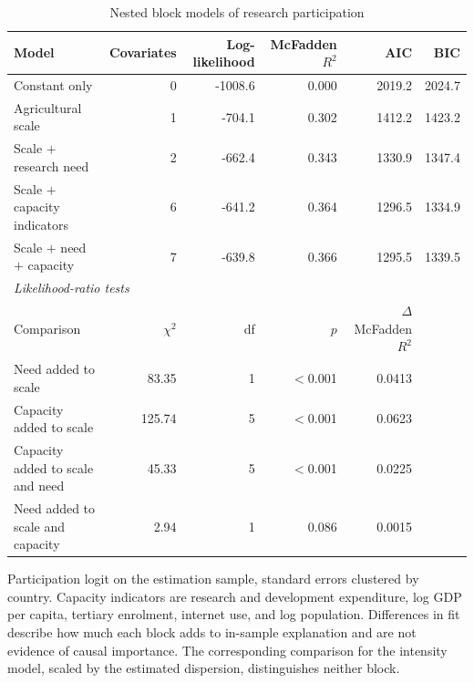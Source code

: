 \documentclass[ASNA,twocolumn]{USG}
\begin{document}
\begin{table}[t]
\centering
\footnotesize
\caption{Nested block models of research participation}
\label{tab:blocks}
\begin{tabular*}{\textwidth}{@{\extracolsep\fill}l r r r r r@{}}
\toprule
Model & Covariates & Log-likelihood & McFadden $R^2$ & AIC & BIC \\
\midrule
Constant only & 0 & -1008.6 & 0.000 & 2019.2 & 2024.7 \\
Agricultural scale & 1 & -704.1 & 0.302 & 1412.2 & 1423.2 \\
Scale $+$ research need & 2 & -662.4 & 0.343 & 1330.9 & 1347.4 \\
Scale $+$ capacity indicators & 6 & -641.2 & 0.364 & 1296.5 & 1334.9 \\
Scale $+$ need $+$ capacity & 7 & -639.8 & 0.366 & 1295.5 & 1339.5 \\
\midrule
\multicolumn{6}{l}{\textit{Likelihood-ratio tests}} \\
Comparison & $\chi^2$ & df & $p$ & $\Delta$ McFadden $R^2$ & \\
Need added to scale & 83.35 & 1 & $<$0.001 & 0.0413 & \\
Capacity added to scale & 125.74 & 5 & $<$0.001 & 0.0623 & \\
Capacity added to scale and need & 45.33 & 5 & $<$0.001 & 0.0225 & \\
Need added to scale and capacity & 2.94 & 1 & 0.086 & 0.0015 & \\
\bottomrule
\end{tabular*}
\begin{tablenotes}
\item[] Participation logit on the estimation sample, standard errors clustered by country. Capacity indicators are research and development expenditure, log GDP per capita, tertiary enrolment, internet use, and log population. Differences in fit describe how much each block adds to in-sample explanation and are not evidence of causal importance. The corresponding comparison for the intensity model, scaled by the estimated dispersion, distinguishes neither block.
\end{tablenotes}
\end{table}
\end{document}
